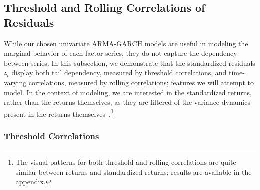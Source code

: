 
\subsection{Threshold and Rolling Correlations of Residuals} %

While our chosen univariate ARMA-GARCH models are useful in modeling the marginal behavior of each factor series, they do not capture the dependency between series. In this subsection, we demonstrate that the standardized residuals ${z_t}$ display both tail dependency, measured by threshold correlations, and time-varying correlations, measured by rolling correlations; features we will attempt to model. In the context of modeling, we are interested in the standardized returns, rather than the returns themselves, as they are filtered of the variance dynamics present in the returns themselves~\autocite{ChristoffersenLanglois2013}.\footnote{The visual patterns for both threshold and rolling correlations are quite similar between returns and standardized returns; results are available in the appendix.}

\subsubsection{Threshold Correlations}

